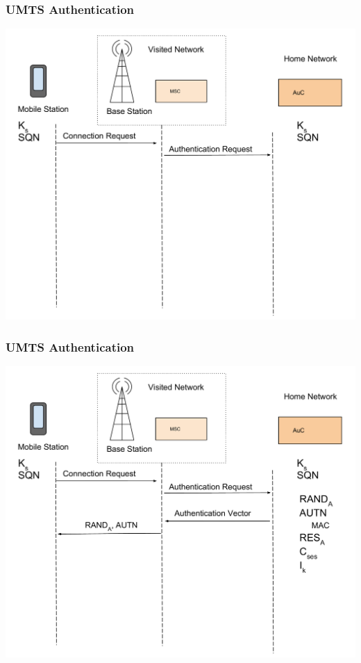 \documentclass{beamer}
\begin{document}
	\begin{frame}
	\frametitle{UMTS Authentication}
  \begin{center}
  \includegraphics[width=.9\textwidth, height=.85\textheight]{Images/UMTSAuthentication1.pdf}

  \end{center} 
	\end{frame}
	\begin{frame}
	\frametitle{UMTS Authentication}
  \begin{center}
  \includegraphics[width=.9\textwidth, height=.85\textheight]{Images/UMTSAuthentication2.pdf}

  \end{center} 
	\end{frame}
\end{document}
